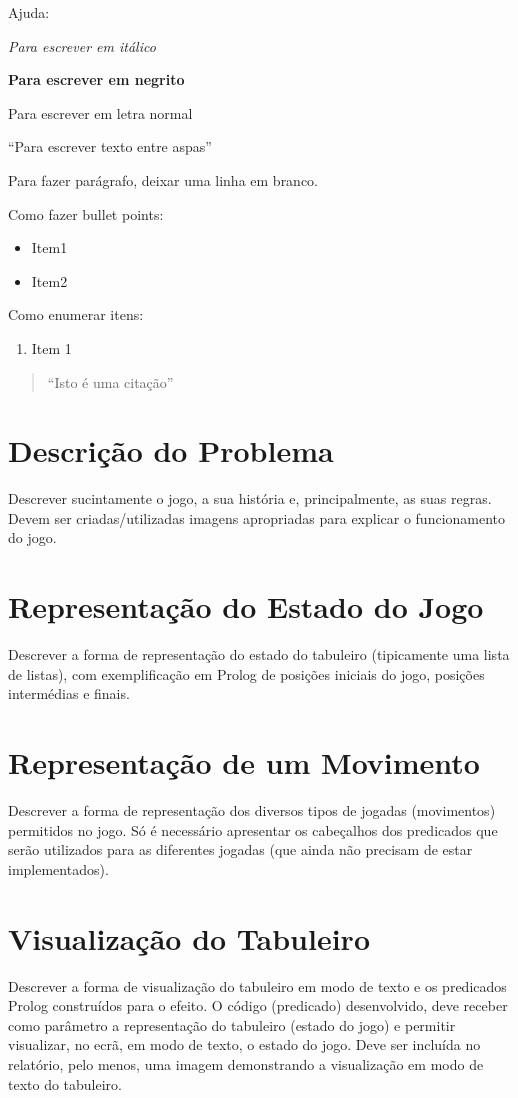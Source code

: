 \documentclass[15pt,a4paper]{article}
\begin{document}
Ajuda:

\textit{Para escrever em itálico}

\textbf{Para escrever em negrito}

Para escrever em letra normal

``Para escrever texto entre aspas''

Para fazer parágrafo, deixar uma linha em branco.

Como fazer bullet points:

\begin{itemize}
\item Item1
\item Item2
\end{itemize}

Como enumerar itens:

\begin{enumerate}
\item Item 1
\end{enumerate}

\begin{quote}``Isto é uma citação''\end{quote}

\section{Descrição do Problema}
Descrever sucintamente o jogo, a sua história e, principalmente, as suas regras. Devem ser criadas/utilizadas imagens apropriadas para explicar o funcionamento do jogo.

\section{Representação do Estado do Jogo}
Descrever a forma de representação do estado do tabuleiro (tipicamente uma lista de listas), com exemplificação em Prolog de posições iniciais do jogo, posições intermédias e finais.

\section{Representação de um Movimento}
Descrever a forma de representação dos diversos tipos de jogadas (movimentos) permitidos no jogo. Só é necessário apresentar os cabeçalhos dos predicados que serão utilizados para as diferentes jogadas (que ainda não precisam de estar implementados).

\section{Visualização do Tabuleiro}
Descrever a forma de visualização do tabuleiro em modo de texto e os predicados Prolog construídos para o efeito. O código (predicado) desenvolvido, deve receber como parâmetro a representação do tabuleiro (estado do jogo) e permitir visualizar, no ecrã, em modo de texto, o estado do jogo. Deve ser incluída no relatório, pelo menos, uma imagem demonstrando a visualização em modo de texto do tabuleiro.
\end{document}
